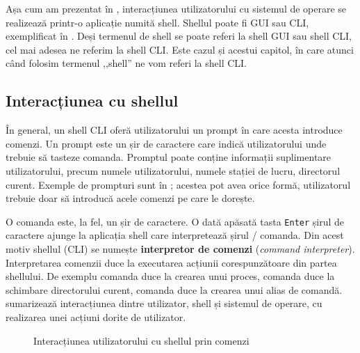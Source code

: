 Așa cum am prezentat în , interacțiunea utilizatorului cu sistemul de operare se realizează printr-o aplicație numită shell. Shellul poate fi GUI sau CLI, exemplificat în . Deși termenul de shell se poate referi la shell GUI sau shell CLI, cel mai adesea ne referim la shell CLI. Este cazul și acestui capitol, în care atunci când folosim termenul ,,shell'' ne vom referi la shell CLI.

\subsection{Interacțiunea cu shellul}
\label{sec:cli:shell:interact}

În general, un shell CLI oferă utilizatorului un prompt în care acesta introduce comenzi. Un prompt este un șir de caractere care indică utilizatorului unde trebuie să tasteze comanda. Promptul poate conține informații suplimentare utilizatorului, precum numele utilizatorului, numele stației de lucru, directorul curent. Exemple de prompturi sunt în ; acestea pot avea orice formă, utilizatorul trebuie doar să introducă acele comenzi pe care le dorește.


O comanda este, la fel, un șir de caractere. O dată apăsată tasta \texttt{Enter} șirul de caractere ajunge la aplicația shell care interpretează șirul / comanda. Din acest motiv shellul (CLI) se numește \textbf{interpretor de comenzi} (\textit{command interpreter}). Interpretarea comenzii duce la executarea acțiunii corespunzătoare din partea shellului. De exemplu comanda  duce la crearea unui proces, comanda  duce la schimbare directorului curent, comanda  duce la crearea unui alias de comandă.  sumarizează interacțiunea dintre utilizator, shell și sistemul de operare, cu realizarea unei acțiuni dorite de utilizator.

\begin{figure}[htbp]
  \centering
  \def\svgwidth{0.6\columnwidth}
  
  \caption{Interacțiunea utilizatorului cu shellul prin comenzi}
  \label{fig:cli:user-shell-cmd}
\end{figure}


